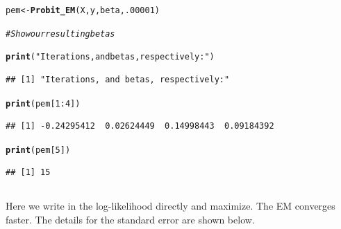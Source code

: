\documentclass{article}\usepackage[]{graphicx}\usepackage[]{color}
\makeatletter
\newcommand{\hlnum}[1]{\textcolor[rgb]{0.686,0.059,0.569}{#1}}%
\newcommand{\hlstr}[1]{\textcolor[rgb]{0.192,0.494,0.8}{#1}}%
\newcommand{\hlcom}[1]{\textcolor[rgb]{0.678,0.584,0.686}{\textit{#1}}}%
\newcommand{\hlopt}[1]{\textcolor[rgb]{0,0,0}{#1}}%
\newcommand{\hlstd}[1]{\textcolor[rgb]{0.345,0.345,0.345}{#1}}%
\newcommand{\hlkwb}[1]{\textcolor[rgb]{0.69,0.353,0.396}{#1}}%
\newcommand{\hlkwd}[1]{\textcolor[rgb]{0.737,0.353,0.396}{\textbf{#1}}}%
\newenvironment{kframe}{%
 \def\at@end@of@kframe{}%
 \ifinner\ifhmode%
  \def\at@end@of@kframe{\end{minipage}}%
  \begin{minipage}{\columnwidth}%
 \fi\fi%
 \def\FrameCommand##1{\hskip\@totalleftmargin \hskip-\fboxsep
 \colorbox{shadecolor}{##1}\hskip-\fboxsep
     \hskip-\linewidth \hskip-\@totalleftmargin \hskip\columnwidth}%
 \MakeFramed {\advance\hsize-\width
   \@totalleftmargin\z@ \linewidth\hsize
   \@setminipage}}%
 {\par\unskip\endMakeFramed%
 \at@end@of@kframe}
\newenvironment{knitrout}{}{} %
\makeatother
\begin{document}
\begin{knitrout}
\begin{kframe}
\begin{alltt}
\hlstd{pem} \hlkwb{<-} \hlkwd{Probit_EM}\hlstd{(X, y, beta,} \hlnum{.00001}\hlstd{)}

\hlcom{# Show our resulting betas}

\hlkwd{print}\hlstd{(}\hlstr{"Iterations, and betas, respectively:"}\hlstd{)}
\end{alltt}
\begin{verbatim}
## [1] "Iterations, and betas, respectively:"
\end{verbatim}
\begin{alltt}
\hlkwd{print}\hlstd{(pem[}\hlnum{1}\hlopt{:}\hlnum{4}\hlstd{])}
\end{alltt}
\begin{verbatim}
## [1] -0.24295412  0.02624449  0.14998443  0.09184392
\end{verbatim}
\begin{alltt}
\hlkwd{print}\hlstd{(pem[}\hlnum{5}\hlstd{])}
\end{alltt}
\begin{verbatim}
## [1] 15
\end{verbatim}
\end{kframe}
\end{knitrout}

\subsection{}

Here we write in the log-likelihood directly and maximize.  The EM converges faster.  The details for the standard error are shown below.
\end{document}
